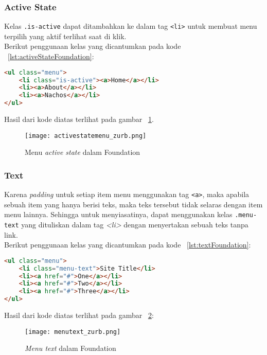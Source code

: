 \subsubsection{Active State}
Kelas \texttt{.is-active} dapat ditambahkan ke dalam tag \texttt{<li>} untuk membuat menu terpilih yang aktif terlihat saat di klik. \\
Berikut penggunaan kelas yang dicantumkan pada kode ~\ref{lst:activeStateFoundation}:

\begin{lstlisting}[style=customhtml, language=HTML,  basicstyle=\ttfamily, frame=single, columns=fullflexible, keepspaces=true, breaklines=true, showstringspaces=false, label={lst:activeStateFoundation}, caption=Active State Foundation 6.] 
<ul class="menu">
	<li class="is-active"><a>Home</a></li>
	<li><a>About</a></li>
	<li><a>Nachos</a></li>
</ul>
\end{lstlisting}
Hasil dari kode diatas terlihat pada gambar ~\ref{fig:activeStateFoundation}.
\begin{figure} [H]
	\centering  
	\texttt{[image: activestatemenu\_zurb.png]}  
	\caption{Menu \textit{active state} dalam Foundation}
	\label{fig:activeStateFoundation}
\end{figure}


\subsubsection{Text}
Karena \textit{padding} untuk setiap item menu menggunakan tag \texttt{<a>}, maka apabila sebuah item yang hanya berisi teks, maka teks tersebut tidak selaras dengan item menu lainnya. Sehingga untuk menyiasatinya, dapat menggunakan kelas \texttt{.menu-text} yang dituliskan dalam tag \textit{<li>} dengan menyertakan sebuah teks tanpa link.\\
Berikut penggunaan kelas yang dicantumkan pada kode ~\ref{lst:textFoundation}:

\begin{lstlisting}[style=customhtml, language=HTML,  basicstyle=\ttfamily, frame=single, columns=fullflexible, keepspaces=true, breaklines=true, showstringspaces=false, label={lst:textFoundation}, caption=Text Foundation 6.]
<ul class="menu">
	<li class="menu-text">Site Title</li>
	<li><a href="#">One</a></li>
	<li><a href="#">Two</a></li>
	<li><a href="#">Three</a></li>
</ul>
\end{lstlisting}
Hasil dari kode diatas terlihat pada gambar ~\ref{fig:menuTextFoundation}:
\begin{figure} [H]
	\centering  
	\texttt{[image: menutext\_zurb.png]}  
	\caption{\textit{Menu text} dalam Foundation}
	\label{fig:menuTextFoundation}
\end{figure}

